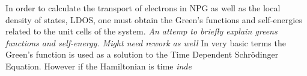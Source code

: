 In order to calculate the transport of electrons in NPG as well as the local density of states, LDOS, one must obtain the Green's functions and self-energies related to the unit cells of the system. \textit{An attemp to briefly explain greens functions and self-energy. Might need rework as well} In very basic terms the Green's function is used as a solution to the Time Dependent Schr\"{o}dinger Equation. However if the Hamiltonian is time \textit{inde}
